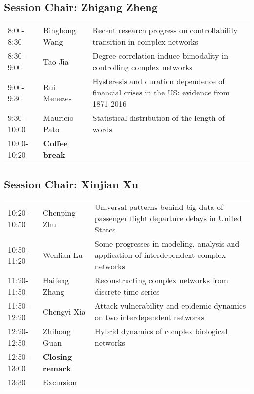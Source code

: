 \documentclass[oneside,A4paper,12pt]{article}
\begin{document}
\subsection*{Session \uppercase\expandafter{}  \hspace{10mm} Chair: Zhigang Zheng}
\label{sec:org1a35356}

\begin{center}
\begin{tabular}{p{2.5cm}p{4cm}p{8.5cm}}
\toprule
8:00-8:30 & Binghong Wang & Recent research progress on controllability transition in complex networks\\
8:30-9:00 & Tao Jia & Degree correlation induce bimodality in controlling complex networks\\
9:00-9:30 & Rui Menezes & Hysteresis and duration dependence of financial crises in the US: evidence from 1871-2016\\
9:30-10:00 & Mauricio Pato & Statistical distribution of the length of words\\
\cellcolor{blue!25}10:00-10:20 & \cellcolor{blue!25}\textbf{Coffee break} & \cellcolor{blue!25}\\
\bottomrule
\end{tabular}
\end{center}

\subsection*{Session \uppercase\expandafter{}  \hspace{10mm} Chair: Xinjian Xu}
\label{sec:orgdf43cf2}

\begin{center}
\begin{tabular}{p{2.5cm}p{4cm}p{8.5cm}}
\toprule
10:20-10:50 & Chenping Zhu & Universal patterns behind big data of passenger flight departure delays in United States\\
10:50-11:20 & Wenlian Lu & Some progresses in modeling, analysis and application of interdependent complex networks\\
11:20-11:50 & Haifeng Zhang & Reconstructing complex networks from discrete time series\\
11:50-12:20 & Chengyi Xia & Attack vulnerability and epidemic dynamics on two interdependent networks\\
12:20-12:50 & Zhihong Guan & Hybrid dynamics of complex biological networks\\
\cellcolor{red!25}12:50-13:00 & \cellcolor{red!25}\textbf{Closing remark} & \cellcolor{red!25}\\
13:30 & Excursion & \\
\bottomrule
\end{tabular}
\end{center}
\end{document}
